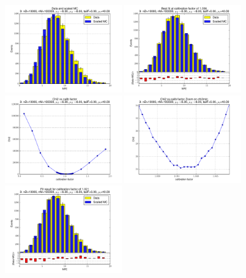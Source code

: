 
 \begin{figure}[htbp] \begin{center} 
\includegraphics[width=0.45\textwidth]{../FIGURES/03/FIG_Data_and_scaled_MC.pdf} 
\includegraphics[width=0.45\textwidth]{../FIGURES/03/FIG_Best_fit_at_calibration_factor_of_1_036.pdf} 
\includegraphics[width=0.45\textwidth]{../FIGURES/03/FIG_Chi2_vs_calib_factor.pdf} 
\includegraphics[width=0.45\textwidth]{../FIGURES/03/FIG_Chi2_vs_calib_factor_Zoom_on_chi2min.pdf} 
\includegraphics[width=0.45\textwidth]{../FIGURES/03/FIG_Fit_result_for_calibration_factor_of_1_021.pdf} 

\end{center}
\end{figure}
